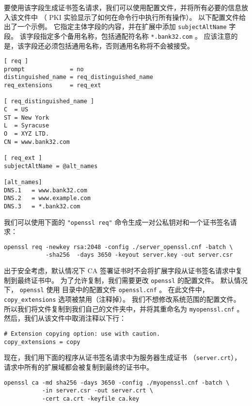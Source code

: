 要使用该字段生成证书签名请求，我们可以使用配置文件，并将所有必要的信息放入该文件中
（ PKI 实验显示了如何在命令行中执行所有操作）。
以下配置文件给出了一个示例。
它指定主体字段的内容，并在扩展中添加 \texttt{subjectAltName} 字段。
该字段指定多个备用名称，包括通配符名称 \texttt{*.bank32.com} 。
应该注意的是，该字段还必须包括通用名称，否则通用名称将不会被接受。


\begin{lstlisting}[caption={\texttt{server\_openssl.cnf}}]
[ req ]
prompt             = no
distinguished_name = req_distinguished_name
req_extensions     = req_ext

[ req_distinguished_name ]
C  = US
ST = New York
L  = Syracuse
O  = XYZ LTD.
CN = www.bank32.com

[ req_ext ]
subjectAltName = @alt_names

[alt_names]
DNS.1   = www.bank32.com
DNS.2   = www.example.com
DNS.3   = *.bank32.com
\end{lstlisting}

我们可以使用下面的 \texttt{"openssl req"} 命令生成一对公私钥对和一个证书签名请求：

\begin{lstlisting}
openssl req -newkey rsa:2048 -config ./server_openssl.cnf -batch \
            -sha256  -days 3650 -keyout server.key -out server.csr
\end{lstlisting}


出于安全考虑，默认情况下 CA 签署证书时不会将扩展字段从证书签名请求中复制到最终证书中。
为了允许复制，我们需要更改 \texttt{openssl} 的配置文件。
默认情况下， \texttt{openssl} 使用 
目录中的配置文件 \texttt{openssl.cnf} 。
在此文件中， \texttt{copy\_extensions} 选项被禁用（注释掉）。
我们不想修改系统范围的配置文件。
所以我们将文件复制到我们自己的文件夹中，并将其重命名为 \texttt{myopenssl.cnf} 。
然后，我们从该文件中取消注释以下行：

\begin{lstlisting}
# Extension copying option: use with caution.
copy_extensions = copy
\end{lstlisting}


现在，我们用下面的程序从证书签名请求中为服务器生成证书 （\texttt{server.crt}），
请求中所有的扩展域都会被复制到最终的证书中。

\begin{lstlisting}
openssl ca -md sha256 -days 3650 -config ./myopenssl.cnf -batch \
           -in server.csr -out server.crt \
           -cert ca.crt -keyfile ca.key
\end{lstlisting}


